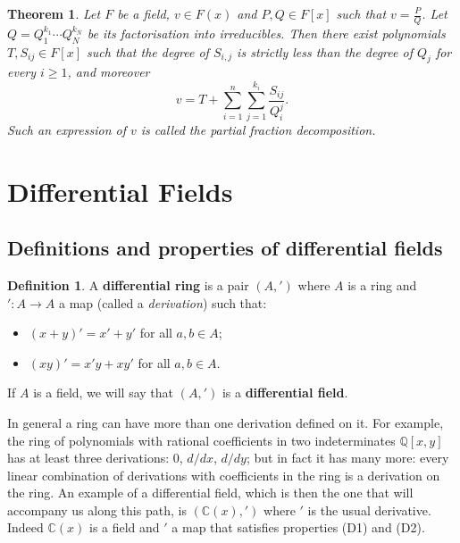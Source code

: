 \documentclass[11pt]{article}
\theoremstyle{plain}
\newtheorem{theorem}{Theorem}
\theoremstyle{definition}
\newtheorem{definition}{Definition}
\theoremstyle{remark}
\newcommand{\C}{\mathbb{C}}
\newcommand{\Q}{\mathbb{Q}}
\begin{document}
\begin{theorem}\label{thm:partialfractions}
Let $F$ be a field, $v \in F(x)$ and $P, Q \in F[x]$ such that
$v = \frac{P}{Q}$. Let $Q = Q_{1}^{k_{1}} \cdots Q_{N}^{k_{N}}$ be its
factorisation into irreducibles. Then there exist polynomials
$T, S_{ij} \in F[x]$ such that the degree of $S_{i,j}$ is strictly less
than the degree of $Q_{j}$ for every $i \ge 1$, and moreover
\[
v = T + \sum_{i=1}^{n} \sum_{j=1}^{k_{i}} \frac{S_{ij}}{Q_{i}^{j}}.
\]
Such an expression of $v$ is called the \emph{partial fraction
decomposition}.
\end{theorem}

\section{Differential Fields}
\subsection*{Definitions and properties of differential fields}

\begin{definition}\label{def:diffring}
A \textbf{differential ring} is a pair $(A, ')$ where $A$ is a ring and
$' : A \to A$ a map (called a \emph{derivation}) such that:
\begin{itemize}
\item[(D1)] $(x + y)' = x' + y'$ for all $a, b \in A$;
\item[(D2)] $(xy)' = x' y + x y'$ for all $a, b \in A$.
\end{itemize}
If $A$ is a field, we will say that $(A, ')$ is a \textbf{differential
field}.
\end{definition}

In general a ring can have more than one derivation defined on it. For
example, the ring of polynomials with rational coefficients in two
indeterminates $\Q[x, y]$ has at least three derivations: $0$, $d/dx$,
$d/dy$; but in fact it has many more: every linear combination of
derivations with coefficients in the ring is a derivation on the ring.
An example of a differential field, which is then the one that will
accompany us along this path, is $(\C(x), ')$ where $'$ is the usual
derivative. Indeed $\C(x)$ is a field and $'$ a map that satisfies
properties (D1) and (D2).
\end{document}
